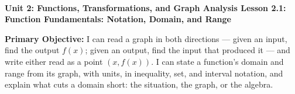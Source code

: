 \documentclass[10pt]{article}
\newcommand{\UnitNumberName}{Unit 2: Functions, Transformations, and Graph Analysis \quad}
\newcommand{\LessonNumberName}{Lesson 2.1: Function Fundamentals: Notation, Domain, and Range}
\begin{document}
\begin{center}
    {\Large\bfseries \CourseName \\
    {\small\bfseries \UnitNumberName \LessonNumberName}}
\end{center}

\begin{tcolorbox}[colback=mist, colframe=royal, boxrule=0.9pt, arc=2mm,
    left=2mm, right=2mm, top=1.5mm, bottom=1.5mm]
    \textbf{Primary Objective:} I can read a graph in both directions --- given an input, find the
    output $f(x)$; given an output, find the input that produced it --- and write either read as a
    point $(x, f(x))$. I can state a function's domain and range from its graph, with units, in
    inequality, set, and interval notation, and explain what cuts a domain short: the situation,
    the graph, or the algebra.
\end{tcolorbox}
\end{document}
